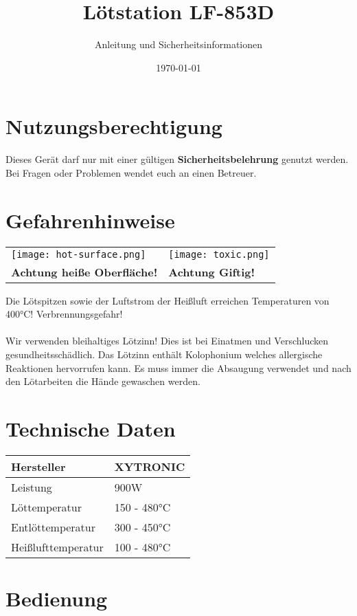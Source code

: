 \documentclass[a4paper]{article}
\begin{document}
\author{Anleitung und Sicherheitsinformationen} %
\title{Lötstation LF-853D}
\date{\today{}} %
\maketitle{} %
\section{Nutzungsberechtigung}
Dieses Gerät darf nur mit einer gültigen \textbf{Sicherheitsbelehrung} genutzt werden. Bei Fragen oder Problemen wendet euch an einen Betreuer.
\section{Gefahrenhinweise}
\begin{center}
	\begin{tabular}{C{5cm}C{5cm}}
		\texttt{[image: hot-surface.png]} & \texttt{[image: toxic.png]}\\
		\textbf{Achtung heiße Oberfläche!} & \textbf{Achtung Giftig!}
	\end{tabular}
\end{center}
Die Lötspitzen sowie der Luftstrom der Heißluft erreichen Temperaturen von 400°C! Verbrennungsgefahr! \\\\
Wir verwenden bleihaltiges Lötzinn! Dies ist bei Einatmen und Verschlucken gesundheitsschädlich. Das Lötzinn enthält Kolophonium welches allergische Reaktionen hervorrufen kann.
Es muss immer die Absaugung verwendet und nach den Lötarbeiten die Hände gewaschen werden.
\section{Technische Daten}
 \begin{tabular}{|l|l|}
 	\hline
 	Hersteller & XYTRONIC\\
 	\hline
	Leistung & 900W \\
	\hline 
	Löttemperatur & 150 - 480°C\\
	\hline
	Entlöttemperatur & 300 - 450°C\\
	\hline
	Heißlufttemperatur & 100 - 480°C\\
	\hline
\end{tabular}
\newpage
\section{Bedienung}
\end{document}
